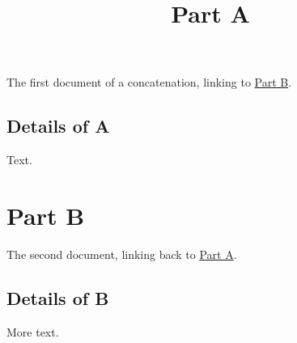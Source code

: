 \documentclass[
]{article}
\title{Part A}
\author{}
\date{}
\begin{document}
\maketitle

\renewcommand*\contentsname{Contents}
{
\hypersetup{linkcolor=}
\setcounter{tocdepth}{3}
\tableofcontents
}
The first document of a concatenation, linking to \hyperref[part-b]{Part
B}.

\subsection{Details of A}\label{details-of-a}

Text.

\newpage

\section{Part B}\label{part-b}

The second document, linking back to \hyperref[part-a]{Part A}.

\subsection{Details of B}\label{details-of-b}

More text.
\end{document}
